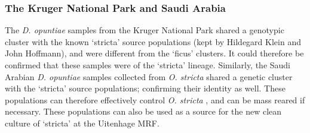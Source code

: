 \subsubsection{The Kruger National Park and Saudi Arabia}
The \textit{D. opuntiae} samples from the Kruger National Park shared a genotypic cluster with the known `stricta' source populations (kept by Hildegard Klein and John Hoffmann), and were different from the `ficus' clusters. It could therefore be confirmed that these samples were of the `stricta' lineage. Similarly, the Saudi Arabian \textit{D. opuntiae} samples collected from \textit{O. stricta} shared a genetic cluster with the `stricta' source populations; confirming their identity as well. These populations can therefore effectively control \textit{O. stricta} \citep{githure1999host, Volchansky1999}, and can be mass reared if necessary. These populations can also be used as a source for the new clean culture of `stricta' at the Uitenhage MRF.

